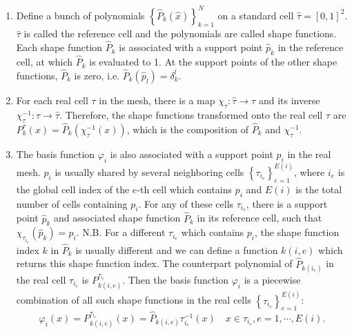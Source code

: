 \documentclass[11pt, a4paper]{book}
\begin{document}
\begin{enumerate}
\item Define a bunch of polynomials $\left\{ \hat{P}_k(\hat{x}) \right\}_{k=1}^N$ on a
  standard cell $\hat{\tau}=[0,1]^2$. $\hat{\tau}$ is called the reference cell and the
  polynomials are called shape functions. Each shape function $\hat{P}_k$ is associated
  with a support point $\hat{p}_k$ in the reference cell, at which $\hat{P}_k$ is
  evaluated to 1. At the support points of the other shape functions, $\hat{P}_k$ is zero,
  i.e. $\hat{P}_k(\hat{p}_{l}) = \delta_k^l$.
\item For each real cell $\tau$ in the mesh, there is a map
  $\chi_{\tau}: \hat{\tau} \rightarrow \tau$ and its inverse
  $\chi_{\tau}^{-1}: \tau \rightarrow \hat{\tau}$. Therefore, the shape functions
  transformed onto the real cell $\tau$ are
  $P_k^{\tau}(x) = \hat{P}_k(\chi_{\tau}^{-1}(x))$, which is the composition of
  $\hat{P}_k$ and $\chi_{\tau}^{-1}$.
\item The basis function $\varphi_i$ is also associated with a support point $p_i$ in the
  real mesh. $p_i$ is usually shared by several neighboring cells
  $\left\{ \tau_{i_{e}} \right\}_{e=1}^{E(i)}$, where $i_e$ is the global cell index of
  the $e$-th cell which contains $p_i$ and $E(i)$ is the total number of cells containing
  $p_i$. For any of these cells $\tau_{i_e}$, there is a support point $\hat{p}_k$ and
  associated shape function $\hat{P}_k$ in its reference cell, such that
  $\chi_{\tau_{i_e}}(\hat{p}_k) = p_i$. N.B. For a different $\tau_{i_e}$ which contains
  $p_i$, the shape function index $k$ in $\hat{P}_k$ is usually different and we can
  define a function $k(i, e)$ which returns this shape function index. The counterpart
  polynomial of $\hat{P}_{k(i_e)}$ in the real cell $\tau_{i_e}$ is
  $P_{k(i, e)}^{\tau_{i_e}}$. Then the basis function $\varphi_i$ is a piecewise
  combination of all such shape functions in the real cells
  $\left\{ \tau_{i_e} \right\}_{e=1}^{E(i)}$:
  \begin{equation}
    \label{eq:basis-function-from-shape-functions}
    \varphi_i(x) = P_{k(i,e)}^{\tau_{i_e}}(x) = \hat{P}_{k(i,e)}\tau_{i_e}^{-1}(x) \quad x\in\tau_{i_e}, e=1,\cdots,E(i).
  \end{equation}
\end{enumerate}
\end{document}
